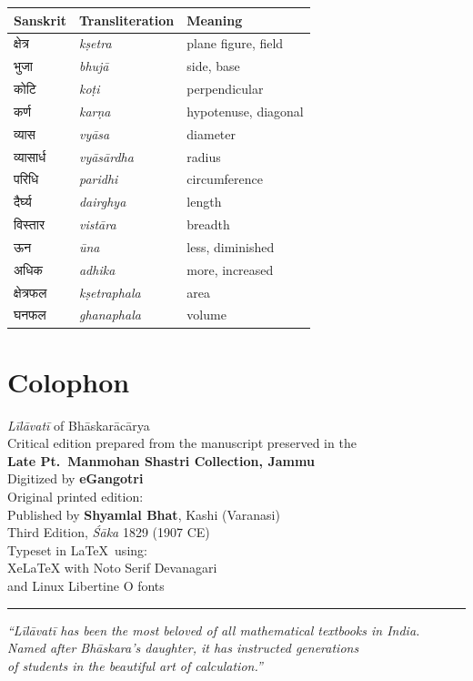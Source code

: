 \documentclass[10pt,a4paper]{article}
\newcommand{\shortline}{\noindent\rule{0.5\textwidth}{0.4pt}\par}
\newcommand{\dev}[1]{{\devanagarifont #1}}
\begin{document}
\begin{longtable}{@{}lll@{}}
\toprule
\textbf{Sanskrit} & \textbf{Transliteration} & \textbf{Meaning} \\
\midrule
\endhead
\dev{क्षेत्र} & \textit{kṣetra} & plane figure, field \\
\dev{भुजा} & \textit{bhujā} & side, base \\
\dev{कोटि} & \textit{koṭi} & perpendicular \\
\dev{कर्ण} & \textit{karṇa} & hypotenuse, diagonal \\
\dev{व्यास} & \textit{vyāsa} & diameter \\
\dev{व्यासार्ध} & \textit{vyāsārdha} & radius \\
\dev{परिधि} & \textit{paridhi} & circumference \\
\dev{दैर्घ्य} & \textit{dairghya} & length \\
\dev{विस्तार} & \textit{vistāra} & breadth \\
\dev{ऊन} & \textit{ūna} & less, diminished \\
\dev{अधिक} & \textit{adhika} & more, increased \\
\dev{क्षेत्रफल} & \textit{kṣetraphala} & area \\
\dev{घनफल} & \textit{ghanaphala} & volume \\
\bottomrule
\end{longtable}

\section*{Colophon}

\begin{center}
\begin{minipage}{0.85\textwidth}
\centering
\textit{Līlāvatī} of Bhāskarācārya\\
Critical edition prepared from the manuscript preserved in the\\
\textbf{Late Pt.\ Manmohan Shastri Collection, Jammu}\\
Digitized by \textbf{eGangotri}\\[0.3em]

Original printed edition:\\
Published by \textbf{Shyamlal Bhat}, Kashi (Varanasi)\\
Third Edition, \textit{Śāka} 1829 (1907 CE)\\[0.3em]

Typeset in \LaTeX\ using:\\
\textsf{XeLaTeX} with \textsf{Noto Serif Devanagari}\\
and \textsf{Linux Libertine O} fonts\\[0.5em]

\shortline

\textit{``Līlāvatī has been the most beloved of all mathematical textbooks in India.\\
Named after Bhāskara's daughter, it has instructed generations\\
of students in the beautiful art of calculation.''}

\end{minipage}
\end{center}
\end{document}

